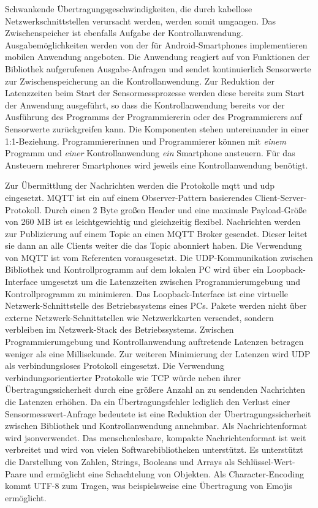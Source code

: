 \documentclass[11pt,a4paper]{report}
\begin{document}
Schwankende Übertragungsgeschwindigkeiten, die durch kabellose Netzwerkschnittstellen verursacht werden, werden somit umgangen.
Das Zwischenspeicher ist ebenfalls Aufgabe der Kontrollanwendung.
Ausgabemöglichkeiten werden von der für Android-Smartphones implementieren mobilen Anwendung angeboten.
Die Anwendung reagiert auf von Funktionen der Bibliothek aufgerufenen Ausgabe-Anfragen und sendet kontinuierlich Sensorwerte zur Zwischenspeicherung an die Kontrollanwendung.
Zur Reduktion der Latenzzeiten beim Start der Sensormessprozesse werden diese bereits zum Start der Anwendung ausgeführt, so dass die Kontrollanwendung bereits vor der Ausführung des Programms der Programmiererin oder des Programmierers auf Sensorwerte zurückgreifen kann.
Die Komponenten stehen untereinander in einer 1:1-Beziehung.
Programmiererinnen und Programmierer können mit \textit{einem} Programm und \textit{einer} Kontrollanwendung \textit{ein} Smartphone ansteuern.
Für das Ansteuern mehrerer Smartphones wird jeweils eine Kontrollanwendung benötigt.

Zur Übermittlung der Nachrichten werden die Protokolle \acrfull{mqtt} und \acrfull{udp} eingesetzt.
MQTT ist ein auf einem Observer-Pattern basierendes Client-Server-Protokoll.
Durch einen 2 Byte großen Header und eine maximale Payload-Größe von 260 MB \cite{mqtt-size} ist es leichtgewichtig und gleichzeitig flexibel.
Nachrichten werden zur Publizierung auf einem Topic an einen MQTT Broker gesendet.
Dieser leitet sie dann an alle Clients weiter die das Topic abonniert haben.
Die Verwendung von MQTT ist vom Referenten vorausgesetzt.
Die UDP-Kommunikation zwischen Bibliothek und Kontrollprogramm auf dem lokalen PC wird über ein Loopback-Interface umgesetzt um die Latenzzeiten zwischen Programmierumgebung und Kontrollprogramm zu minimieren.
Das Loopback-Interface ist eine virtuelle Netzwerk-Schnittstelle des Betriebssystems eines PCs.
Pakete werden nicht über externe Netzwerk-Schnittstellen wie Netzwerkkarten versendet, sondern verbleiben im Netzwerk-Stack des Betriebssystems.
Zwischen Programmierumgebung und Kontrollanwendung auftretende Latenzen betragen weniger als eine Millisekunde.
Zur weiteren Minimierung der Latenzen wird UDP als verbindungsloses Protokoll eingesetzt.
Die Verwendung verbindungsorientierter Protokolle wie TCP würde neben ihrer Übertragungssicherheit durch eine größere Anzahl an zu sendenden Nachrichten die Latenzen erhöhen.
Da ein Übertragungsfehler lediglich den Verlust einer Sensormesswert-Anfrage bedeutete ist eine Reduktion der Übertragungssicherheit zwischen Bibliothek und Kontrollanwendung annehmbar.  
Als Nachrichtenformat wird \acrfull{json}verwendet.
Das menschenlesbare, kompakte Nachrichtenformat ist weit verbreitet und wird von vielen Softwarebibliotheken unterstützt.
Es unterstützt die Darstellung von Zahlen, Strings, Booleans und Arrays als Schlüssel-Wert-Paare und ermöglicht eine Schachtelung von Objekten.
Als Character-Encoding kommt UTF-8 zum Tragen, was beispielsweise eine Übertragung von Emojis ermöglicht.
\end{document}
